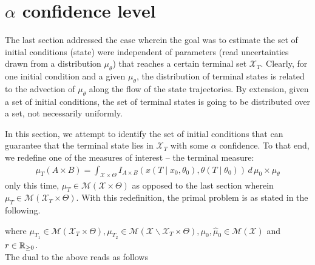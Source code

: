 \documentclass[10pt]{scrartcl}
\theoremstyle{remark}
\providecommand{\R}{\ensuremath \mathbb{R}}
\providecommand{\ip}[1]{\ensuremath \langle #1\rangle}
\begin{document}
\section{$\alpha$ confidence level}
The last section addressed the case wherein the goal was to estimate the set of initial conditions (state) were independent of parameters (read uncertainties drawn from a distribution $\mu_\theta$) that reaches a certain terminal set $\mathcal X_T$. Clearly, for one initial condition and a given $\mu_\theta$, the distribution of terminal states is related to the advection of $\mu_\theta$ along the flow of the state trajectories. By extension, given a set of initial conditions, the set of terminal states is going to be distributed over a set, not necessarily uniformly.\par
In this section, we attempt to identify the set of initial conditions that can guarantee that the terminal state lies in $\mathcal X_T$ with some $\alpha $ confidence.
To that end, we redefine one of the measures of interest -- the terminal measure:
\begin{align}
\mu_T(A\times B)=\int_{\mathcal X\times \Theta} I_{A\times B}(x(T\mid x_0,\theta_0),\theta(T\mid \theta_0))\,d\,\mu_0\times \mu_\theta	
\end{align}
only this time, $\mu_T\in \mathcal M(\mathcal X\times \Theta)$ as opposed to the last section wherein $\mu_T\in \mathcal M(\mathcal X_T\times \Theta)$. With this redefinition, the primal problem is as stated in the following.
where $\mu_{T_1}\in \mathcal M(\mathcal X_T\times \Theta), \mu_{T_2}\in \mathcal M(\mathcal X\backslash \mathcal X_T\times \Theta),\mu_0,\hat \mu_0\in \mathcal M(\mathcal X)$ and $r\in \R_{\ge 0}$.\\
The dual to the above reads as follows
\end{document}
